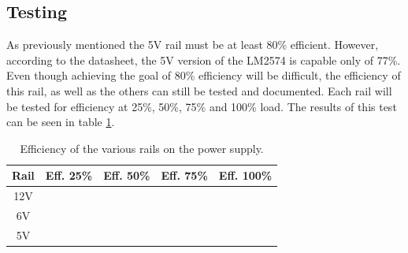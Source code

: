 \subsection{Testing}
As previously mentioned the 5V rail must be at least 80\% efficient. However, according to the datasheet, the 5V version of the LM2574 is capable only of 77\%. Even though achieving the goal of 80\% efficiency will be difficult, the efficiency of this rail, as well as the others can still be tested and documented. Each rail will be tested for efficiency at 25\%, 50\%, 75\% and 100\% load. The results of this test can be seen in table \ref{tab:efficiency}. 
\begin{table}[h!]
	\centering
	\begin{tabular}{| c | c | c | c | c |}
		\hline
		Rail & Eff. 25\% & Eff. 50\% & Eff. 75\% & Eff. 100\% \\
		\hline
		12V  & & & &\\
		\hline
		6V   & & & &\\
		\hline		
		5V   & & & &\\
		\hline
	\end{tabular}
	\caption[Power supply efficiency]{Efficiency of the various rails on the power supply.}
	\label{tab:efficiency}
\end{table}